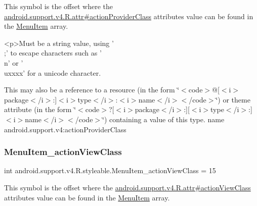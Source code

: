 This symbol is the offset where the \hyperlink{classandroid_1_1support_1_1v4_1_1R_1_1attr_a49f63fe97c5151a21fa424c599c51354}{android.\+support.\+v4.\+R.\+attr\#action\+Provider\+Class} attribute\textquotesingle{}s value can be found in the \hyperlink{classandroid_1_1support_1_1v4_1_1R_1_1styleable_a4234e016636b99c0c3d9cfc512903697}{Menu\+Item} array.

\begin{DoxyVerb}      <p>Must be a string value, using '\\;' to escape characters such as '\\n' or '\\uxxxx' for a unicode character.
\end{DoxyVerb}
 

This may also be a reference to a resource (in the form \char`\"{}$<$code$>$@\mbox{[}$<$i$>$package$<$/i$>$\+:\mbox{]}$<$i$>$type$<$/i$>$\+:$<$i$>$name$<$/i$>$$<$/code$>$\char`\"{}) or theme attribute (in the form \char`\"{}$<$code$>$?\mbox{[}$<$i$>$package$<$/i$>$\+:\mbox{]}\mbox{[}$<$i$>$type$<$/i$>$\+:\mbox{]}$<$i$>$name$<$/i$>$$<$/code$>$\char`\"{}) containing a value of this type.  name android.\+support.\+v4\+:action\+Provider\+Class \mbox{\label{classandroid_1_1support_1_1v4_1_1R_1_1styleable_a083070b1aa74ecfc2abe1a5349047c5c}} 
\subsubsection{\texorpdfstring{Menu\+Item\+\_\+action\+View\+Class}{MenuItem\_actionViewClass}}
{\footnotesize\ttfamily int android.\+support.\+v4.\+R.\+styleable.\+Menu\+Item\+\_\+action\+View\+Class = 15\hspace{0.3cm}{\ttfamily [static]}}

This symbol is the offset where the \hyperlink{classandroid_1_1support_1_1v4_1_1R_1_1attr_a9db9f5e44ffd00051c6d74e396af5a02}{android.\+support.\+v4.\+R.\+attr\#action\+View\+Class} attribute\textquotesingle{}s value can be found in the \hyperlink{classandroid_1_1support_1_1v4_1_1R_1_1styleable_a4234e016636b99c0c3d9cfc512903697}{Menu\+Item} array.

